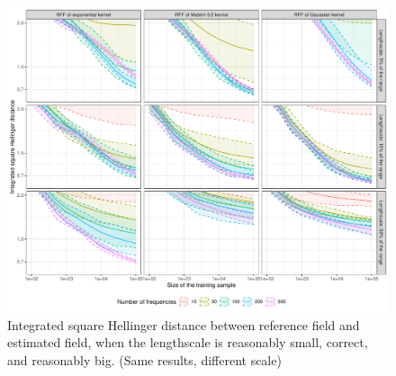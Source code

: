 \documentclass[
]{article}
\begin{document}
\begin{figure}[H]

{\centering \includegraphics{IntroductionSLGP_files/figure-latex/PlotOtherLen2-1} 

}

\caption{Integrated square Hellinger distance between reference field and estimated field, when the lengthscale is reasonably small, correct, and reasonably big. (Same results, different scale)}\label{fig:PlotOtherLen2}
\end{figure}

  
\end{document}
